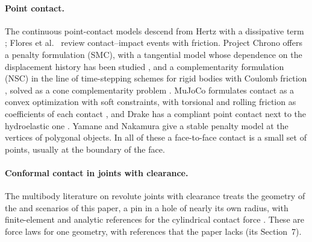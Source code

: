 \paragraph{Point contact.} The continuous point-contact models descend from Hertz
\cite{Hertz1882} with a dissipative term \cite{HuntCrossley1975,Lankarani1990,Flores2011};
Flores et al.~\cite{Flores2023} review contact--impact events with friction. Project Chrono
\cite{Tasora2016} offers a penalty formulation (SMC), with a tangential model whose dependence
on the displacement history has been studied \cite{Fleischmann2016}, and a complementarity
formulation (NSC) in the line of time-stepping schemes for rigid bodies with Coulomb friction
\cite{Stewart1996,Anitescu1997}, solved as a cone complementarity problem
\cite{Anitescu2010,Mazhar2015}. MuJoCo \cite{Todorov2012,Todorov2014} formulates contact as a
convex optimization with soft constraints, with torsional and rolling friction as coefficients
of each contact \cite{MuJoCoDocs}, and Drake has a compliant point contact next to the
hydroelastic one \cite{DrakePointContact}. Yamane and Nakamura \cite{Yamane2006} give a stable
penalty model at the vertices of polygonal objects. In all of these a face-to-face contact is a
small set of points, usually at the boundary of the face.

\paragraph{Conformal contact in joints with clearance.} The multibody literature on revolute
joints with clearance treats the geometry of the  and  scenarios of
this paper, a pin in a hole of nearly its own radius, with finite-element and analytic
references for the cylindrical contact force \cite{Liu2007,Pereira2011,Pereira2015}. These are
force laws for one geometry, with references that the paper lacks
(its Section~7).

